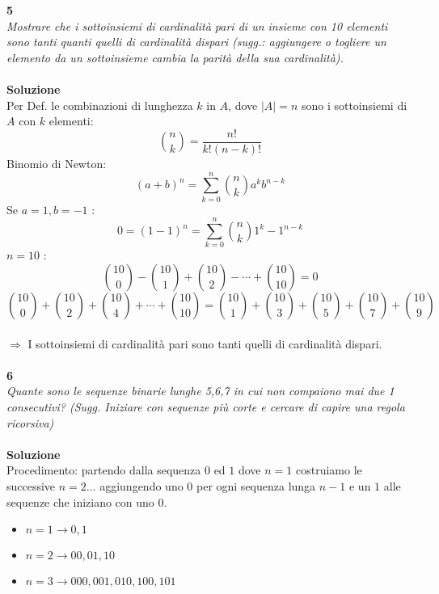 \documentclass[12pt]{article}
\begin{document}
            \\\\
            \textbf{\large 5} \\
			\textit{Mostrare che i sottoinsiemi di cardinalit\`a pari di un insieme con 10 elementi sono tanti quanti quelli di cardinalit\`a dispari (sugg.: aggiungere o togliere un elemento da un sottoinsieme cambia la parità della sua cardinalit\`a).} \\\\
			\textbf{Soluzione} \\
			Per Def. le combinazioni di lunghezza $k$ in $A$, dove $|A|=n$ sono i sottoinsiemi di $A$ con $k$ elementi:
			\[
				\binom{n}{k} = \frac{n!}{k!(n-k)!}
			\]
			Binomio di Newton: \\
			\[
				(a+b)^n = \sum_{k=0}^{n} \binom{n}{k}a^k b^{n-k}
			\]
			Se $a=1,b=-1$ :
			\[
				0=(1-1)^n = \sum_{k=0}^{n} \binom{n}{k}1^k -1^{n-k}
			\]
			$n=10$ :
			\[
				\binom{10}{0} - \binom{10}{1} + \binom{10}{2} - \cdots + \binom{10}{10} =0 
			\]
    		\[
				\binom{10}{0} + \binom{10}{2} + \binom{10}{4} + \cdots + \binom{10}{10} = \binom{10}{1} + \binom{10}{3} + \binom{10}{5} +  \binom{10}{7} + \binom{10}{9}
			\]
			\\
			$\Longrightarrow$ I sottoinsiemi di cardinalit\`a pari sono tanti quelli di cardinalit\`a dispari.
			\\\\
			\textbf{\large 6} \\
			\textit{Quante sono le sequenze binarie lunghe 5,6,7 in cui non compaiono mai due 1
consecutivi? (Sugg. Iniziare con sequenze pi\`u corte e cercare di capire una
regola ricorsiva)} \\\\
			\textbf{Soluzione} \\
			Procedimento: partendo dalla sequenza $0$ ed $1$ dove $n=1$ costruiamo le successive $n=2\ldots$ aggiungendo uno 0 per ogni sequenza lunga $n-1$ e un $1$ alle sequenze che iniziano con uno $0$.
			\begin{itemize}
				\item $n=1 \rightarrow 0,1$ 
				\item $n=2 \rightarrow 00,01,10$
				\item $n=3 \rightarrow  000,001,010,100,101$
			\end{itemize}
\end{document}
